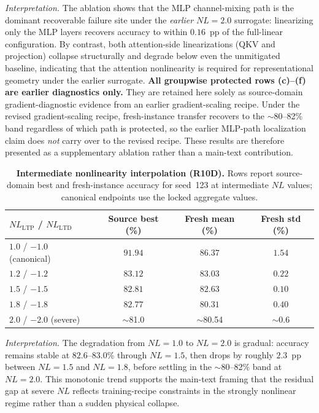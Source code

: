 \textit{Interpretation.} The ablation shows that the MLP channel-mixing path is the dominant recoverable failure site under the \emph{earlier} $NL=2.0$ surrogate: linearizing only the MLP layers recovers accuracy to within $0.16$~pp of the full-linear configuration. By contrast, both attention-side linearizations (QKV and projection) collapse structurally and degrade below even the unmitigated baseline, indicating that the attention nonlinearity is required for representational geometry under the earlier surrogate. \textbf{All groupwise protected rows (c)--(f) are earlier diagnostics only.} They are retained here solely as source-domain gradient-diagnostic evidence from an earlier gradient-scaling recipe. Under the revised gradient-scaling recipe, fresh-instance transfer recovers to the $\sim$80--82\% band regardless of which path is protected, so the earlier MLP-path localization claim does \emph{not} carry over to the revised recipe. These results are therefore presented as a supplementary ablation rather than a main-text contribution.

\begin{table}[ht]
    \centering
    \caption{\textbf{Intermediate nonlinearity interpolation (R10D).} Rows report source-domain best and fresh-instance accuracy for seed~123 at intermediate $NL$ values; canonical endpoints use the locked aggregate values.}
    \label{tab:r10d-nl-interpolation}
    \small
    \begin{tabular}{@{}lccc@{}}
        \toprule
        $NL_{\text{LTP}}$ / $NL_{\text{LTD}}$ & Source best (\%) & Fresh mean (\%) & Fresh std (\%) \\
        \midrule
        $1.0$ / $-1.0$ (canonical) & $91.94$ & $86.37$ & $1.54$ \\
        $1.2$ / $-1.2$ & $83.12$ & $83.03$ & $0.22$ \\
        $1.5$ / $-1.5$ & $82.81$ & $82.63$ & $0.10$ \\
        $1.8$ / $-1.8$ & $82.77$ & $80.31$ & $0.40$ \\
        $2.0$ / $-2.0$ (severe) & $\sim$81.0 & $\sim$80.54 & $\sim$0.6 \\
        \bottomrule
    \end{tabular}
\end{table}

\textit{Interpretation.} The degradation from $NL=1.0$ to $NL=2.0$ is gradual: accuracy remains stable at $82.6$--$83.0$\% through $NL=1.5$, then drops by roughly $2.3$~pp between $NL=1.5$ and $NL=1.8$, before settling in the $\sim$80--82\% band at $NL=2.0$. This monotonic trend supports the main-text framing that the residual gap at severe $NL$ reflects training-recipe constraints in the strongly nonlinear regime rather than a sudden physical collapse.

